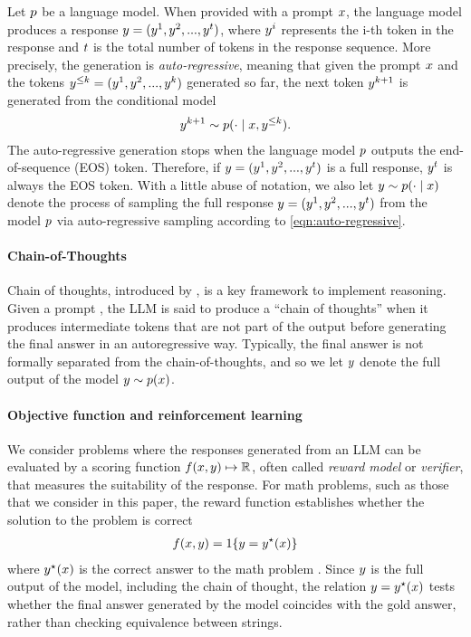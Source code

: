 Let $p$ be a language model. When provided with a prompt $x$, the language model produces a response $y = (y^1,y^2,...,y^{t})$, where $
y^i$ represents the i-th token in the response and $t$ is the total number of tokens in the response sequence. More precisely, the generation is \emph{auto-regressive}, meaning that given the prompt $x$ and the tokens $y^{\leq k} = (y^1,y^2,...,y^{k})$ generated so far, the next token $y^{k+1}$ is generated from the conditional model 
\begin{align}
\label{eqn:auto-regressive}
y^{k+1} \sim p(\cdot \mid x, y^{\leq k} ).
\end{align}
The auto-regressive generation stops when the language model $p$ outputs the end-of-sequence (EOS) token. 
Therefore, if $y = (y^1,y^2,...,y^{t})$ is a full response,
$y^{t}$ is always the EOS token. 
With a little abuse of notation, we also let $y \sim p(\cdot \mid x)$  denote the process of  sampling the full response $y = (y^1,y^2,...,y^{t})$ from the model $p$ via auto-regressive sampling according to \cref{eqn:auto-regressive}. 

\paragraph{Chain-of-Thoughts}
Chain of thoughts, introduced by \citep{wei2022chain}, 
is a key framework to implement reasoning. 
Given a prompt \x{}, the LLM is said to produce a ``chain of thoughts'' 
when it produces intermediate tokens that are not part of the output
before generating the final answer in an autoregressive way. 
Typically, the final answer 
is not formally separated from the chain-of-thoughts, 
and so we let $y$ denote the full output of the model 
$y \sim p(x)$.

\paragraph{Objective function and reinforcement learning}
We consider problems where the responses generated from an LLM can be
 evaluated by a scoring function $f(x,y) \mapsto \mathbb R$, 
 often called \emph{reward model} or \emph{verifier}, 
 that measures the suitability of the response. 
For math problems, such as those that we consider in this paper, 
the reward function establishes whether the solution 
to the problem is correct 
\citep{cobbe2021training,hendrycks2021measuring}
\begin{align}
	f(x,y) 
	=
	{1}\{ y = y^\star(x) \}
\end{align}
where $y^\star(x)$ is the correct answer to the math problem \x{}.
Since $y{}$ is the full output of the model, including the chain of thought, the relation $y = y^\star(x)$
tests whether the final answer generated
by the model coincides with the gold answer, 
rather than checking equivalence between strings.

